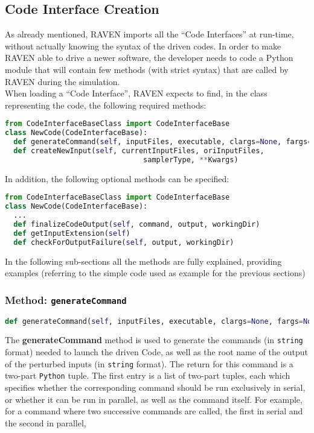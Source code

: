 \subsection{Code Interface Creation}
\label{subsec:codeinterfacecreation}
As already mentioned, RAVEN imports all the ``Code Interfaces'' at run-time,
without actually knowing the syntax of the driven codes. In order to make RAVEN
able to drive a newer software, the developer needs to code a Python module
that will contain few methods (with strict syntax) that are called by RAVEN during the simulation.
\\ When loading a ``Code Interface'', RAVEN expects to find, in the class representing the code,
 the following required methods:
\begin{lstlisting}[language=python]
from CodeInterfaceBaseClass import CodeInterfaceBase
class NewCode(CodeInterfaceBase):
  def generateCommand(self, inputFiles, executable, clargs=None, fargs=None, preExec=None)
  def createNewInput(self, currentInputFiles, oriInputFiles,
                                samplerType, **Kwargs)
\end{lstlisting}
In addition, the following optional methods can be specified:
\begin{lstlisting}[language=python]
from CodeInterfaceBaseClass import CodeInterfaceBase
class NewCode(CodeInterfaceBase):
  ...
  def finalizeCodeOutput(self, command, output, workingDir)
  def getInputExtension(self)
  def checkForOutputFailure(self, output, workingDir)
\end{lstlisting}
In the following sub-sections all the methods are fully explained, providing examples
 (referring to the simple code used as example for the previous sections)
\subsubsection{Method: \texttt{generateCommand}}
\label{subsubsec:generateCommand}
\begin{lstlisting}[language=python]
def generateCommand(self, inputFiles, executable, clargs=None, fargs=None, preExec=None)
\end{lstlisting}
The \textbf{generateCommand} method is used to generate the commands
(in \texttt{string} format) needed to launch the driven Code, as well as the root name of the output of the perturbed inputs (in \texttt{string} format).
The return for this command is a two-part \texttt{Python} tuple.  The first entry is a list of two-part tuples, each
which specifies whether the corresponding command
should be run exclusively in serial, or whether it can be run in parallel, as well as the command itself.
For example, for a command where
two successive commands are called, the first in serial and the second in parallel,

